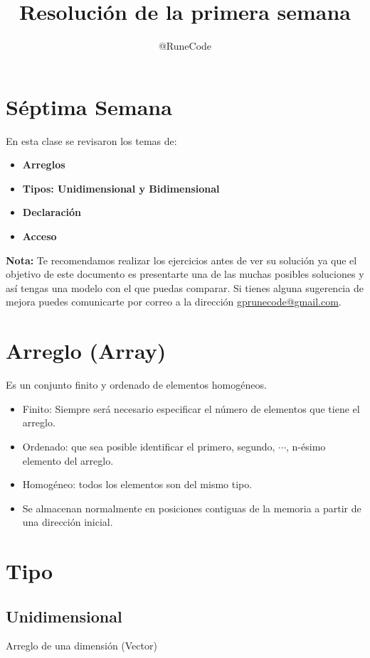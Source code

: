 \documentclass{article}
\title{Resolución de la primera semana}
\author{@RuneCode}
\begin{document}



\section*{Séptima Semana}%
En esta clase se revisaron los temas de:
\begin{itemize}
\item \textbf{Arreglos}
\item \textbf{Tipos: Unidimensional y Bidimensional}
\item \textbf{Declaración}
\item \textbf{Acceso}
\end{itemize}
\vspace{1cm}
\textbf{Nota:} Te recomendamos realizar los ejercicios antes de ver su solución
ya que el objetivo de este documento es presentarte una de las muchas posibles
soluciones y así tengas una modelo con el que puedas comparar. Si tienes alguna
sugerencia de mejora puedes comunicarte por correo a la dirección
\href{mailto:gprunecode@gmail.com}{gprunecode@gmail.com}.

\section{Arreglo (Array)}%
Es un conjunto finito y ordenado de elementos homogéneos.
\begin{itemize}
  \item Finito: Siempre será necesario especificar el número de elementos que tiene el arreglo.
  \item Ordenado: que sea posible identificar el primero, segundo, $\cdots$, n-ésimo elemento del arreglo.
  \item Homogéneo: todos los elementos son del mismo tipo.
  \item Se almacenan normalmente en posiciones contiguas de la memoria a partir de una dirección inicial.
\end{itemize}

\section{Tipo}%
\subsection*{Unidimensional}%
Arreglo de una dimensión (Vector)
\end{document}
